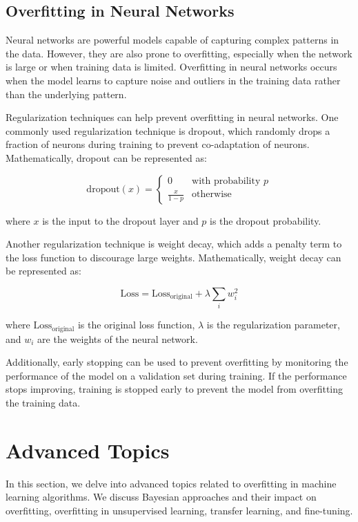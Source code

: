 \documentclass[12pt]{book} %
\begin{document}
\subsection{Overfitting in Neural Networks}

Neural networks are powerful models capable of capturing complex patterns in the data. However, they are also prone to overfitting, especially when the network is large or when training data is limited. Overfitting in neural networks occurs when the model learns to capture noise and outliers in the training data rather than the underlying pattern.

Regularization techniques can help prevent overfitting in neural networks. One commonly used regularization technique is dropout, which randomly drops a fraction of neurons during training to prevent co-adaptation of neurons. Mathematically, dropout can be represented as:

\[
\text{{dropout}}(x) = \begin{cases} 
0 & \text{{with probability }} p \\
\frac{x}{1 - p} & \text{{otherwise}}
\end{cases}
\]

where \( x \) is the input to the dropout layer and \( p \) is the dropout probability.

Another regularization technique is weight decay, which adds a penalty term to the loss function to discourage large weights. Mathematically, weight decay can be represented as:

\[
\text{{Loss}} = \text{{Loss}}_{\text{{original}}} + \lambda \sum_{i} w_i^2
\]

where \( \text{{Loss}}_{\text{{original}}} \) is the original loss function, \( \lambda \) is the regularization parameter, and \( w_i \) are the weights of the neural network.

Additionally, early stopping can be used to prevent overfitting by monitoring the performance of the model on a validation set during training. If the performance stops improving, training is stopped early to prevent the model from overfitting the training data.


\section{Advanced Topics}

In this section, we delve into advanced topics related to overfitting in machine learning algorithms. We discuss Bayesian approaches and their impact on overfitting, overfitting in unsupervised learning, transfer learning, and fine-tuning.
\end{document}

